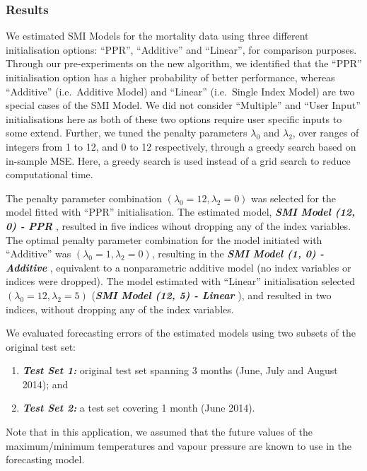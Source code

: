 \documentclass[11pt,a4paper,]{article}
\providecommand{\tightlist}{%
  \setlength{\itemsep}{0pt}\setlength{\parskip}{0pt}}
\begin{document}
\hypertarget{results}{%
\subsubsection{Results}\label{results}}

We estimated SMI Models for the mortality data using three different
initialisation options: ``PPR'', ``Additive'' and ``Linear'', for
comparison purposes. Through our pre-experiments on the new algorithm,
we identified that the ``PPR'' initialisation option has a higher
probability of better performance, whereas ``Additive'' (i.e.~Additive
Model) and ``Linear'' (i.e.~Single Index Model) are two special cases of
the SMI Model. We did not consider ``Multiple'' and ``User Input''
initialisations here as both of these two options require user specific
inputs to some extend. Further, we tuned the penalty parameters
\(\lambda_{0}\) and \(\lambda_{2}\), over ranges of integers from 1 to
12, and 0 to 12 respectively, through a greedy search based on in-sample
MSE. Here, a greedy search is used instead of a grid search to reduce
computational time.

The penalty parameter combination
\((\lambda_{0} = 12, \lambda_{2} = 0)\) was selected for the model
fitted with ``PPR'' initialisation. The estimated model,
\textbf{\emph{SMI Model (12, 0) - PPR }}, resulted in five indices
wihout dropping any of the index variables. The optimal penalty
parameter combination for the model initiated with ``Additive'' was
\((\lambda_{0} = 1, \lambda_{2} = 0)\), resulting in the
\textbf{\emph{SMI Model (1, 0) - Additive }}, equivalent to a
nonparametric additive model (no index variables or indices were
dropped). The model estimated with ``Linear'' initialisation selected
\((\lambda_{0} = 12, \lambda_{2} = 5)\) (\textbf{\emph{SMI Model (12, 5)
- Linear }}), and resulted in two indices, without dropping any of the
index variables.

We evaluated forecasting errors of the estimated models using two
subsets of the original test set:

\begin{enumerate}
\def\labelenumi{\arabic{enumi}.}
\tightlist
\item
  \textbf{\emph{Test Set 1:}} original test set spanning 3 months (June,
  July and August 2014); and
\item
  \textbf{\emph{Test Set 2:}} a test set covering 1 month (June 2014).
\end{enumerate}

Note that in this application, we assumed that the future values of the
maximum/minimum temperatures and vapour pressure are known to use in the
forecasting model.
\end{document}
